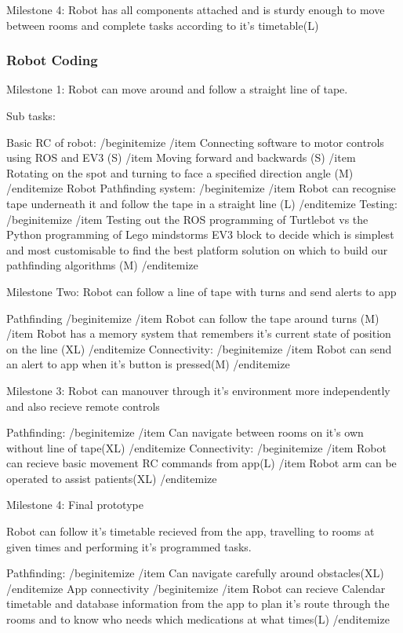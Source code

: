 \documentclass{article}
\begin{document}
Milestone 4: Robot has all components attached and is sturdy enough to move between rooms and complete tasks according to it's timetable(L) 


\subsubsection{Robot Coding}

Milestone 1: Robot can move around and follow a straight line of tape.

Sub tasks: 

Basic RC of robot:
/begin{itemize}
/item Connecting software to motor controls using ROS and EV3 (S)
/item Moving forward and backwards (S)
/item Rotating on the spot and turning to face a specified direction angle (M)
/end{itemize}
Robot Pathfinding system:
/begin{itemize}
/item Robot can recognise tape underneath it and follow the tape in a straight line (L)
/end{itemize}
Testing:
/begin{itemize}
/item Testing out the ROS programming of Turtlebot vs the Python programming of Lego mindstorms EV3 block to decide which is simplest and most customisable to find the best platform solution on which to build our pathfinding algorithms (M)
/end{itemize}

Milestone Two: Robot can follow a line of tape with turns and send alerts to app 

Pathfinding
/begin{itemize}
/item Robot can follow the tape around turns (M)
/item Robot has a memory system that remembers it's current state of position on the line (XL)
/end{itemize}
Connectivity:
/begin{itemize}
/item Robot can send an alert to app when it's button is pressed(M) 
/end{itemize}

Milestone 3: Robot can manouver through it's environment more independently and also recieve remote controls
    
Pathfinding:
/begin{itemize}
/item Can navigate between rooms on it's own without line of tape(XL)
/end{itemize}    
Connectivity:
/begin{itemize}
/item Robot can recieve basic movement RC commands from app(L)
/item Robot arm can be operated to assist patients(XL)   
/end{itemize}
    
Milestone 4: Final prototype

Robot can follow it's timetable recieved from the app, travelling to rooms at given times and performing it's programmed tasks.

Pathfinding:
/begin{itemize}
/item Can navigate carefully around obstacles(XL)       
/end{itemize}
App connectivity 
/begin{itemize}
/item Robot can recieve Calendar timetable and database information from the app to plan it's route through the rooms and to know who         needs which medications at what times(L)
/end{itemize}
    
\end{document}
